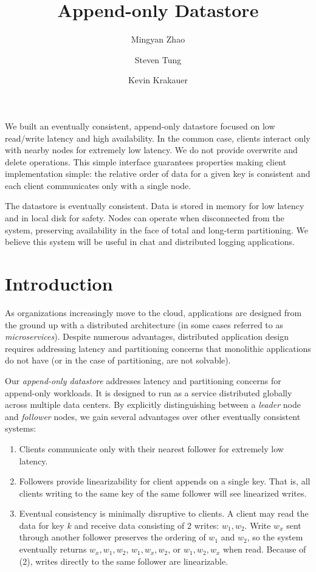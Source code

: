 \documentclass[11pt,english,twocolumn]{article}
\title{Append-only Datastore}
\author{
	Mingyan Zhao
	\and
	Steven Tung
	\and
	Kevin Krakauer
}
\date{}
\begin{document}
\maketitle


\section*{}
We built an eventually consistent, append-only datastore focused on low
read/write latency and high availability. In the common case, clients interact
only with nearby nodes for extremely low latency. We do not provide overwrite
and delete operations. This simple interface guarantees properties making client
implementation simple: the relative order of data for a given key is consistent
and each client communicates only with a single node.

The datastore is eventually consistent. Data is stored in memory for low latency
and in local disk for safety. Nodes can operate when disconnected from the
system, preserving availability in the face of total and long-term partitioning.
We believe this system will be useful in chat and distributed logging
applications.

\section{Introduction}
As organizations increasingly move to the cloud, applications are designed from
the ground up with a distributed architecture (in some cases referred to as
\textit{microservices}). Despite numerous advantages, distributed
application design requires addressing latency and partitioning concerns that
monolithic applications do not have (or in the case of partitioning, are not
solvable).

Our \textit{append-only datastore} addresses latency and partitioning concerns
for append-only workloads. It is designed to run as a service distributed
globally across multiple data centers. By explicitly distinguishing between a
\textit{leader} node and \textit{follower} nodes, we gain several advantages
over other eventually consistent systems:

\begin{enumerate}
	\item Clients communicate only with their nearest follower for extremely
		low latency.
	\item Followers provide linearizability for client appends on a single
		key. That is, all clients writing to the same key of the same
		follower will see linearized writes.
	\item Eventual consistency is minimally disruptive to clients. A client
		may read the data for key $k$ and receive data consisting of 2
		writes: $w_1, w_2$. Write $w_x$ sent through another follower
		preserves the ordering of $w_1$ and $w_2$, so the system
		eventually returns $w_x, w_1, w_2$, $w_1, w_x, w_2$, or $w_1,
		w_2, w_x$ when read.  Because of (2), writes directly to the
		same follower are linearizable.
\end{enumerate}
\end{document}

